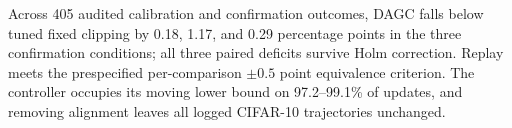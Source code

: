 Across 405 audited calibration and confirmation outcomes, DAGC falls below
tuned fixed clipping by 0.18, 1.17, and 0.29 percentage points in the three
confirmation conditions; all three paired deficits survive Holm correction.
Replay meets the prespecified per-comparison $\pm0.5$ point equivalence
criterion. The controller occupies its moving lower bound on 97.2--99.1\% of
updates, and removing alignment leaves all logged CIFAR-10 trajectories unchanged.
